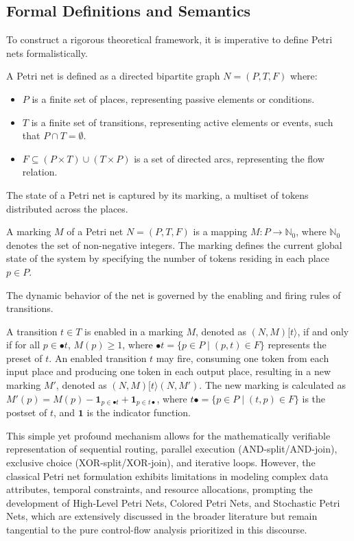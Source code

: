 \subsection{Formal Definitions and Semantics}
To construct a rigorous theoretical framework, it is imperative to define Petri nets formalistically. 
\begin{definition}
A Petri net is defined as a directed bipartite graph $N = (P, T, F)$ where:
\begin{itemize}
    \item $P$ is a finite set of places, representing passive elements or conditions.
    \item $T$ is a finite set of transitions, representing active elements or events, such that $P \cap T = \emptyset$.
    \item $F \subseteq (P \times T) \cup (T \times P)$ is a set of directed arcs, representing the flow relation.
\end{itemize}
\end{definition}

The state of a Petri net is captured by its marking, a multiset of tokens distributed across the places.
\begin{definition}[Marking]
A marking $M$ of a Petri net $N = (P, T, F)$ is a mapping $M: P \rightarrow \mathbb{N}_0$, where $\mathbb{N}_0$ denotes the set of non-negative integers. The marking defines the current global state of the system by specifying the number of tokens residing in each place $p \in P$.
\end{definition}

The dynamic behavior of the net is governed by the enabling and firing rules of transitions.
\begin{definition}
A transition $t \in T$ is enabled in a marking $M$, denoted as $(N, M)[t\rangle$, if and only if for all $p \in \bullet t$, $M(p) \geq 1$, where $\bullet t = \{p \in P \mid (p, t) \in F\}$ represents the preset of $t$.
An enabled transition $t$ may fire, consuming one token from each input place and producing one token in each output place, resulting in a new marking $M'$, denoted as $(N, M)[t\rangle (N, M')$. The new marking is calculated as $M'(p) = M(p) - \mathbf{1}_{p \in \bullet t} + \mathbf{1}_{p \in t \bullet}$, where $t \bullet = \{p \in P \mid (t, p) \in F\}$ is the postset of $t$, and $\mathbf{1}$ is the indicator function.
\end{definition}

This simple yet profound mechanism allows for the mathematically verifiable representation of sequential routing, parallel execution (AND-split/AND-join), exclusive choice (XOR-split/XOR-join), and iterative loops. However, the classical Petri net formulation exhibits limitations in modeling complex data attributes, temporal constraints, and resource allocations, prompting the development of High-Level Petri Nets, Colored Petri Nets, and Stochastic Petri Nets, which are extensively discussed in the broader literature but remain tangential to the pure control-flow analysis prioritized in this discourse.

